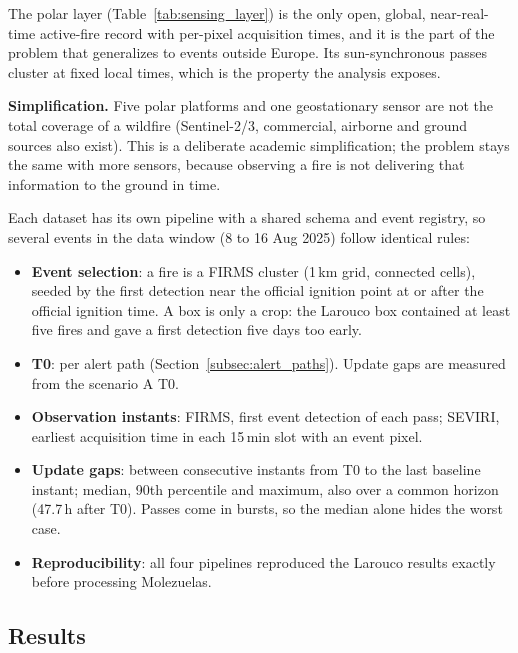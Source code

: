 \documentclass[11pt]{article}
\begin{document}
The polar layer (Table~\ref{tab:sensing_layer}) is the only open, global, near-real-time active-fire record with per-pixel acquisition times, and it is the part of the problem that generalizes to events outside Europe. Its sun-synchronous passes cluster at fixed local times, which is the property the analysis exposes.

\textbf{Simplification.} Five polar platforms and one geostationary sensor are not the total coverage of a wildfire (Sentinel-2/3, commercial, airborne and ground sources also exist). This is a deliberate academic simplification; the problem stays the same with more sensors, because observing a fire is not delivering that information to the ground in time.

Each dataset has its own pipeline with a shared schema and event registry, so several events in the data window (8 to 16 Aug 2025) follow identical rules:
\begin{itemize}
  \item \textbf{Event selection}: a fire is a FIRMS cluster (1\,km grid, connected cells), seeded by the first detection near the official ignition point at or after the official ignition time. A box is only a crop: the Larouco box contained at least five fires and gave a first detection five days too early.
  \item \textbf{T0}: per alert path (Section~\ref{subsec:alert_paths}). Update gaps are measured from the scenario A T0.
  \item \textbf{Observation instants}: FIRMS, first event detection of each pass; SEVIRI, earliest acquisition time in each 15\,min slot with an event pixel.
  \item \textbf{Update gaps}: between consecutive instants from T0 to the last baseline instant; median, 90th percentile and maximum, also over a common horizon (47.7\,h after T0). Passes come in bursts, so the median alone hides the worst case.
  \item \textbf{Reproducibility}: all four pipelines reproduced the Larouco results exactly before processing Molezuelas.
\end{itemize}

\subsection{Results}
\label{subsec:baseline_results}
\end{document}
